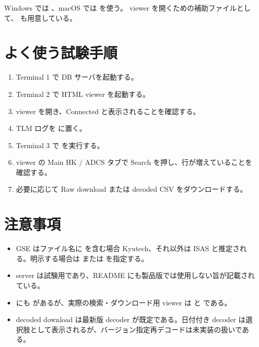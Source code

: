 \documentclass[a4paper,11pt]{ltjsarticle}
\begin{document}
Windows では 、macOS では  を使う。
viewer を開くための補助ファイルとして、 も用意している。

\section{よく使う試験手順}

\begin{enumerate}
  \item Terminal 1 で DB サーバを起動する。
  \item Terminal 2 で HTML viewer を起動する。
  \item viewer を開き、Connected と表示されることを確認する。
  \item TLM ログを  に置く。
  \item Terminal 3 で  を実行する。
  \item viewer の Main HK / ADCS タブで Search を押し、行が増えていることを確認する。
  \item 必要に応じて Raw download または decoded CSV をダウンロードする。
\end{enumerate}

\section{注意事項}

\begin{itemize}
  \item GSE はファイル名に  を含む場合 Kyutech、それ以外は ISAS と推定される。明示する場合は  または  を指定する。
  \item server は試験用であり、README にも製品版では使用しない旨が記載されている。
  \item {} にも  があるが、実際の検索・ダウンロード用 viewer は  と  である。
  \item decoded download は最新版 decoder が既定である。日付付き decoder は選択肢として表示されるが、バージョン指定再デコードは未実装の扱いである。
\end{itemize}
\end{document}
